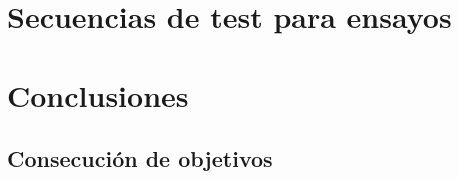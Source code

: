 \documentclass[a4paper, 12pt]{report}
\begin{document}

\cleardoublepage
\chapter{Secuencias de test para ensayos}



\cleardoublepage
\chapter{Conclusiones}
\label{chap:conclusiones}

\section{Consecución de objetivos}
\label{sec:consecucion-objetivos}
\end{document}
